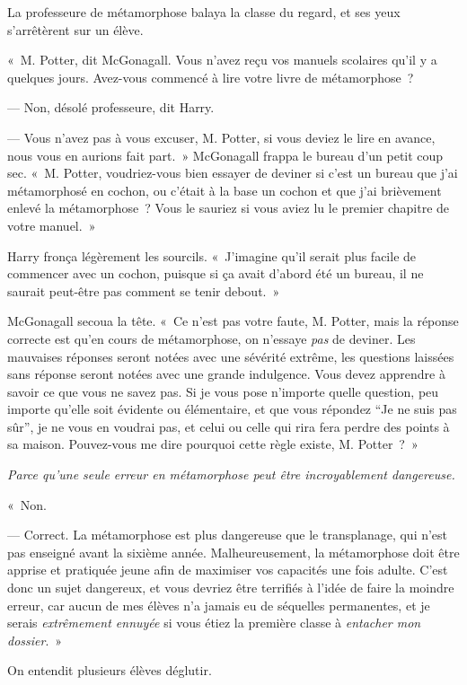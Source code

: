 La professeure de métamorphose balaya la classe du regard, et ses yeux s'arrêtèrent sur un élève.

«~M. Potter, dit McGonagall.
Vous n'avez reçu vos manuels scolaires qu'il y a quelques jours.
Avez-vous commencé à lire votre livre de métamorphose~?

--- Non, désolé professeure, dit Harry.

--- Vous n'avez pas à vous excuser, M. Potter, si vous deviez le lire en avance, nous vous en aurions fait part.~»
McGonagall frappa le bureau d'un petit coup sec.
«~M. Potter, voudriez-vous bien essayer de deviner si c'est un bureau que j'ai métamorphosé en cochon, ou c'était à la base un cochon et que j'ai brièvement enlevé la métamorphose~?
Vous le sauriez si vous aviez lu le premier chapitre de votre manuel.~»

Harry fronça légèrement les sourcils.
«~J'imagine qu'il serait plus facile de commencer avec un cochon, puisque si ça avait d'abord été un bureau, il ne saurait peut-être pas comment se tenir debout.~»

McGonagall secoua la tête.
«~Ce n'est pas votre faute, M. Potter, mais la réponse correcte est qu'en cours de métamorphose, on n'essaye \emph{pas} de deviner.
Les mauvaises réponses seront notées avec une sévérité extrême, les questions laissées sans réponse seront notées avec une grande indulgence.
Vous devez apprendre à savoir ce que vous ne savez pas.
Si je vous pose n'importe quelle question, peu importe qu'elle soit évidente ou élémentaire, et que vous répondez “Je ne suis pas sûr”, je ne vous en voudrai pas, et celui ou celle qui rira fera perdre des points à sa maison.
Pouvez-vous me dire pourquoi cette règle existe, M. Potter~?~»

\emph{Parce qu'une seule erreur en métamorphose peut être incroyablement dangereuse.}

«~Non.

--- Correct.
La métamorphose est plus dangereuse que le transplanage, qui n'est pas enseigné avant la sixième année.
Malheureusement, la métamorphose doit être apprise et pratiquée jeune afin de maximiser vos capacités une fois adulte.
C'est donc un sujet dangereux, et vous devriez être terrifiés à l'idée de faire la moindre erreur, car aucun de mes élèves n'a jamais eu de séquelles permanentes, et je serais \emph{extrêmement ennuyée} si vous étiez la première classe à \emph{entacher mon dossier}.~»

On entendit plusieurs élèves déglutir.

